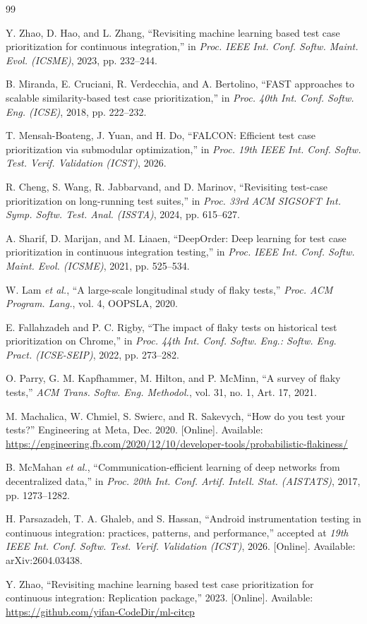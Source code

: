 \documentclass[10pt,conference]{IEEEtran}
\begin{document}
\begin{thebibliography}{99}

Y. Zhao, D. Hao, and L. Zhang, ``Revisiting machine learning based test case prioritization for continuous integration,'' in \textit{Proc. IEEE Int. Conf. Softw. Maint. Evol. (ICSME)}, 2023, pp. 232--244.

B. Miranda, E. Cruciani, R. Verdecchia, and A. Bertolino, ``FAST approaches to scalable similarity-based test case prioritization,'' in \textit{Proc. 40th Int. Conf. Softw. Eng. (ICSE)}, 2018, pp. 222--232.

T. Mensah-Boateng, J. Yuan, and H. Do, ``FALCON: Efficient test case prioritization via submodular optimization,'' in \textit{Proc. 19th IEEE Int. Conf. Softw. Test. Verif. Validation (ICST)}, 2026.

R. Cheng, S. Wang, R. Jabbarvand, and D. Marinov, ``Revisiting test-case prioritization on long-running test suites,'' in \textit{Proc. 33rd ACM SIGSOFT Int. Symp. Softw. Test. Anal. (ISSTA)}, 2024, pp. 615--627.

A. Sharif, D. Marijan, and M. Liaaen, ``DeepOrder: Deep learning for test case prioritization in continuous integration testing,'' in \textit{Proc. IEEE Int. Conf. Softw. Maint. Evol. (ICSME)}, 2021, pp. 525--534.

W. Lam \textit{et al.}, ``A large-scale longitudinal study of flaky tests,'' \textit{Proc. ACM Program. Lang.}, vol. 4, OOPSLA, 2020.

E. Fallahzadeh and P. C. Rigby, ``The impact of flaky tests on historical test prioritization on Chrome,'' in \textit{Proc. 44th Int. Conf. Softw. Eng.: Softw. Eng. Pract. (ICSE-SEIP)}, 2022, pp. 273--282.

O. Parry, G. M. Kapfhammer, M. Hilton, and P. McMinn, ``A survey of flaky tests,'' \textit{ACM Trans. Softw. Eng. Methodol.}, vol. 31, no. 1, Art. 17, 2021.

M. Machalica, W. Chmiel, S. Swierc, and R. Sakevych, ``How do you test your tests?'' Engineering at Meta, Dec. 2020. [Online]. Available: \url{https://engineering.fb.com/2020/12/10/developer-tools/probabilistic-flakiness/}

B. McMahan \textit{et al.}, ``Communication-efficient learning of deep networks from decentralized data,'' in \textit{Proc. 20th Int. Conf. Artif. Intell. Stat. (AISTATS)}, 2017, pp. 1273--1282.

H. Parsazadeh, T. A. Ghaleb, and S. Hassan, ``Android instrumentation testing in continuous integration: practices, patterns, and performance,'' accepted at \textit{19th IEEE Int. Conf. Softw. Test. Verif. Validation (ICST)}, 2026. [Online]. Available: arXiv:2604.03438.

Y. Zhao, ``Revisiting machine learning based test case prioritization for continuous integration: Replication package,'' 2023. [Online]. Available: \url{https://github.com/yifan-CodeDir/ml-citcp}

\end{thebibliography}
\end{document}
